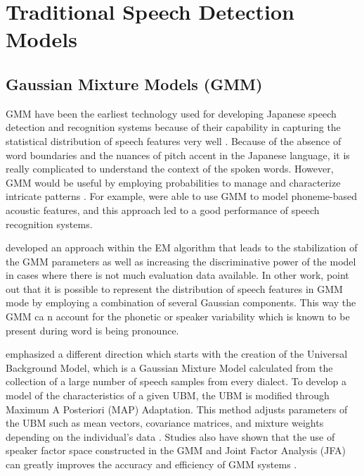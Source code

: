\section{Traditional Speech Detection Models } 
\subsection{Gaussian Mixture Models (GMM)}
GMM have been the earliest technology used for developing Japanese speech detection and recognition systems because of their capability in capturing the statistical distribution of speech features very well \parencite{Imaishi2022Examination}. Because of the absence of word boundaries and the nuances of pitch accent in the Japanese language, it is really complicated to understand the context of the spoken words. However, GMM would be useful by employing probabilities to manage and characterize intricate patterns \parencite{sun2020subspace}. For example, \textcite{povey2011subspace} were able to use GMM to model phoneme-based acoustic features, and this approach led to a good performance of speech recognition systems.

 \textcite{Imaishi2022Examination} developed an approach within the EM algorithm that leads to the stabilization of the GMM parameters as well as increasing the discriminative power of the model in cases where there is not much evaluation data available. In other work, \textcite{povey2011subspace} point out that it is possible to represent the distribution of speech features in GMM mode by employing a combination of several Gaussian components. This way the GMM ca n account for the phonetic or speaker variability which is known to be present during word is being pronounce.

\textcite{Takami2020Performance} emphasized a different direction which starts with the creation of the Universal Background Model, which is a Gaussian Mixture Model calculated from the collection of a large number of speech samples from every dialect. To develop a model of the characteristics of a given UBM, the UBM is modified through Maximum A Posteriori (MAP) Adaptation. This method adjusts parameters of the UBM such as mean vectors, covariance matrices, and mixture weights depending on the individual’s data \parencite{dehak2009support}. Studies also  have shown that the use of speaker factor space constructed in the GMM and Joint Factor Analysis (JFA) can greatly improves the accuracy and efficiency of GMM systems \parencite{matrouf2011modeling}.

